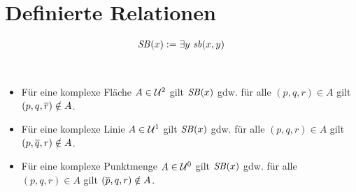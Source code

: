 \section{Definierte Relationen}

% 
% 

\begin{erin}
    \begin{align*}
        \mathit{S\hspace*{-0.25ex}B}(x) := \exists y\ \mathit{sb}(x,y)
    \end{align*}
\end{erin}

\begin{hyp}\ 
    \begin{itemize}
        \item Für eine komplexe Fläche $A \in \mathcal{U}^2$ gilt $\mathit{S\hspace*{-0.25ex}B}(x)$ gdw. für alle $(p,q,r) \in A$ gilt $(p,q,\overline{r}) \notin A$.
        \item Für eine komplexe Linie $A \in \mathcal{U}^1$ gilt $\mathit{S\hspace*{-0.25ex}B}(x)$ gdw. für alle $(p,q,r) \in A$ gilt $(p,\overline{q},r) \notin A$.
        \item Für eine komplexe Punktmenge $A \in \mathcal{U}^0$ gilt $\mathit{S\hspace*{-0.25ex}B}(x)$ gdw. für alle $(p,q,r) \in A$ gilt $(\overline{p},q,r) \notin A$.
    \end{itemize}
\end{hyp}



